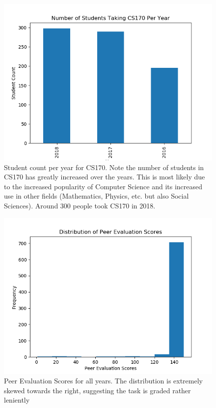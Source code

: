 \documentclass[12pt,letterpaper]{article}
\begin{document}
\begin{figure}[!htb]
  \includegraphics[width=\linewidth]{graph7.png}
  \caption{Student count per year for CS170. Note the number of students in CS170 has greatly increased over the years. This is most likely due to the increased popularity of Computer Science and its increased use in other fields (Mathematics, Physics, etc. but also Social Sciences). Around 300 people took CS170 in 2018.}
\end{figure}

\begin{figure}[!htb]
  \includegraphics[width=\linewidth]{graph8.png}
  \caption{Peer Evaluation Scores for all years. The distribution is extremely skewed towards the right, suggesting the task is graded rather leniently}
\end{figure}
\end{document}
